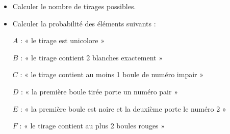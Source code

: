 \documentclass[12pt]{article}
\begin{document}
\begin{itemize}
    \item Calculer le nombre de tirages possibles.
    \item Calculer la probabilité des éléments suivants :
\end{itemize}

\begin{itemize}
    \item[$A$ :] « le tirage est unicolore »
    \item[$B$ :] « le tirage contient 2 blanches exactement »
    \item[$C$ :] « le tirage contient au moins 1 boule de numéro impair »
     \item[$D$ :] « la première boule tirée porte un numéro pair »
    \item[$E$ :] « la première boule est noire et la deuxième porte le numéro 2 »
    \item[$F$ :] « le tirage contient au plus 2 boules rouges »
\end{itemize}
\end{document}
